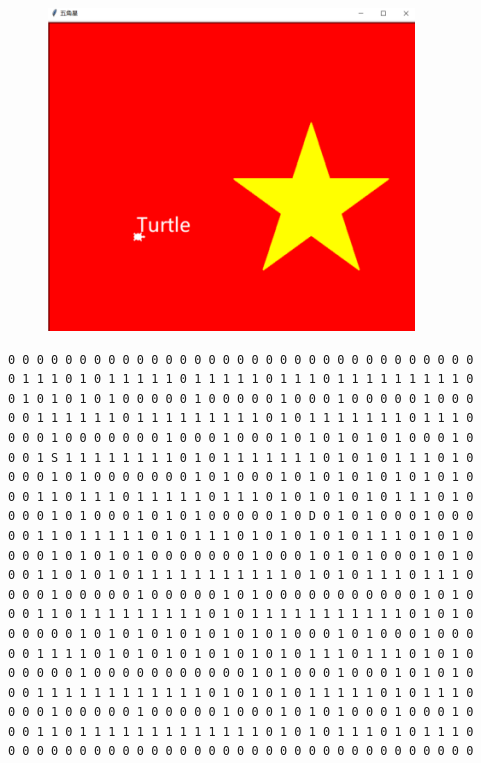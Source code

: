 \begin{tcolorbox}
	\begin{figure}[H]
		\centering
		\includegraphics[scale=1.5]{img/C13/13-6/1.png}
	\end{figure}
\end{tcolorbox}

\vspace{0.5cm}


\begin{lstlisting}[title=maze.txt]
0 0 0 0 0 0 0 0 0 0 0 0 0 0 0 0 0 0 0 0 0 0 0 0 0 0 0 0 0 0 0 0 0
0 1 1 1 0 1 0 1 1 1 1 1 0 1 1 1 1 1 0 1 1 1 0 1 1 1 1 1 1 1 1 1 0
0 1 0 1 0 1 0 1 0 0 0 0 0 1 0 0 0 0 0 1 0 0 0 1 0 0 0 0 0 1 0 0 0
0 0 1 1 1 1 1 1 0 1 1 1 1 1 1 1 1 1 0 1 0 1 1 1 1 1 1 1 0 1 1 1 0
0 0 0 1 0 0 0 0 0 0 0 1 0 0 0 1 0 0 0 1 0 1 0 1 0 1 0 1 0 0 0 1 0
0 0 1 S 1 1 1 1 1 1 1 1 0 1 0 1 1 1 1 1 1 1 0 1 0 1 0 1 1 1 0 1 0
0 0 0 1 0 1 0 0 0 0 0 0 0 1 0 1 0 0 0 1 0 1 0 1 0 1 0 1 0 1 0 1 0
0 0 1 1 0 1 1 1 0 1 1 1 1 1 0 1 1 1 0 1 0 1 0 1 0 1 0 1 1 1 0 1 0
0 0 0 1 0 1 0 0 0 1 0 1 0 1 0 0 0 0 0 1 0 D 0 1 0 1 0 0 0 1 0 0 0
0 0 1 1 0 1 1 1 1 1 0 1 0 1 1 1 0 1 0 1 0 1 0 1 0 1 1 1 0 1 0 1 0
0 0 0 1 0 1 0 1 0 1 0 0 0 0 0 0 0 1 0 0 0 1 0 1 0 1 0 0 0 1 0 1 0
0 0 1 1 0 1 0 1 0 1 1 1 1 1 1 1 1 1 1 1 0 1 0 1 0 1 1 1 0 1 1 1 0
0 0 0 1 0 0 0 0 0 1 0 0 0 0 0 1 0 1 0 0 0 0 0 0 0 0 0 0 0 1 0 1 0
0 0 1 1 0 1 1 1 1 1 1 1 1 1 0 1 0 1 1 1 1 1 1 1 1 1 1 1 0 1 0 1 0
0 0 0 0 0 1 0 1 0 1 0 1 0 1 0 1 0 1 0 1 0 0 0 1 0 1 0 0 0 1 0 0 0
0 0 1 1 1 1 0 1 0 1 0 1 0 1 0 1 0 1 0 1 0 1 1 1 0 1 1 1 0 1 0 1 0
0 0 0 0 0 1 0 0 0 0 0 0 0 0 0 0 0 1 0 1 0 0 0 1 0 0 0 1 0 1 0 1 0
0 0 1 1 1 1 1 1 1 1 1 1 1 1 0 1 0 1 0 1 0 1 1 1 1 1 0 1 0 1 1 1 0
0 0 0 1 0 0 0 0 0 1 0 0 0 0 0 1 0 0 0 1 0 1 0 1 0 0 0 1 0 0 0 1 0
0 0 1 1 0 1 1 1 1 1 1 1 1 1 1 1 1 1 0 1 0 1 0 1 1 1 0 1 0 1 1 1 0
0 0 0 0 0 0 0 0 0 0 0 0 0 0 0 0 0 0 0 0 0 0 0 0 0 0 0 0 0 0 0 0 0
\end{lstlisting}

